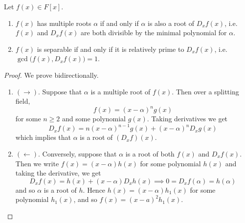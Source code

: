   \begin{theorem}
    Let $f(x) \in F[x]$. 
    \begin{enumerate}
      \item $f(x)$ has multiple roots $\alpha$ if and only if $\alpha$ is also a root of $D_x f(x)$, i.e. $f(x)$ and $D_x f(x)$ are both divisible by the minimal polynomial for $\alpha$. 
      \item $f(x)$ is separable if and only if it is relatively prime to $D_x f(x)$, i.e. $\gcd\big( f(x), D_x f(x) \big) = 1$. 
    \end{enumerate}
  \end{theorem}
  \begin{proof}
    We prove bidirectionally. 
    \begin{enumerate}
      \item $(\rightarrow)$. Suppose that $\alpha$ is a multiple root of $f(x)$. Then over a splitting field, 
      \begin{equation}
        f(x) = (x - \alpha)^n g(x)
      \end{equation}
      for some $n \geq 2$ and some polynomial $g(x)$. Taking derivatives we get 
      \begin{equation}
        D_x f(x) = n (x - \alpha)^{n-1} g(x) + (x - \alpha)^n D_x g(x) 
      \end{equation}
      which implies that $\alpha$ is a root of $(D_x f)(x)$. 

      \item $(\leftarrow)$. Conversely, suppose that $\alpha$ is a root of both $f(x)$ and $D_x f(x)$. Then we write $f(x) = (x - \alpha) h(x)$ for some polynomial $h(x)$ and taking the derivative, we get 
        \begin{equation}
          D_x f(x) = h(x) + (x - \alpha) D_x h(x) \implies 0 = D_x f(\alpha) = h(\alpha)
        \end{equation} 
        and so $\alpha$ is a root of $h$. Hence $h(x) = (x - \alpha) h_1 (x)$ for some polynomial $h_1 (x)$, and so $f(x) = (x - a)^2 h_1 (x)$. 
    \end{enumerate}
  \end{proof}

